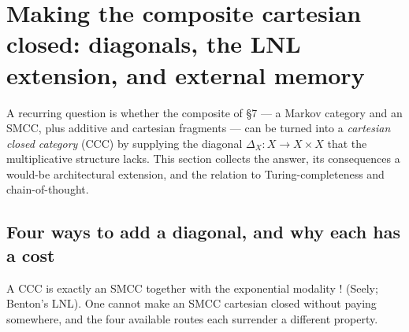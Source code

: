 \documentclass[a4paper,11pt]{article}
\begin{document}
\hypertarget{making-the-composite-cartesian-closed-diagonals-the-lnl-extension-and-external-memory}{%
\section{Making the composite cartesian closed: diagonals, the LNL extension, and external memory}\label{making-the-composite-cartesian-closed-diagonals-the-lnl-extension-and-external-memory}}

A recurring question is whether the composite of §7 --- a Markov
category and an SMCC, plus additive and cartesian fragments --- can be
turned into a \emph{cartesian closed category} (CCC) by supplying the
diagonal \(\Delta_X : X \to X\times X\) that the multiplicative
structure lacks. This section collects the answer, its consequences 
a would-be architectural extension, and the relation to Turing-completeness and chain-of-thought.

\hypertarget{four-ways-to-add-a-diagonal-and-why-each-has-a-cost}{%
\subsection{Four ways to add a diagonal, and why each has a cost}\label{four-ways-to-add-a-diagonal-and-why-each-has-a-cost}}

A CCC is exactly an SMCC together with the exponential modality \(!\) (Seely; Benton's LNL). One cannot make an SMCC cartesian closed without paying somewhere, and the four available routes each surrender a different property.
\end{document}
